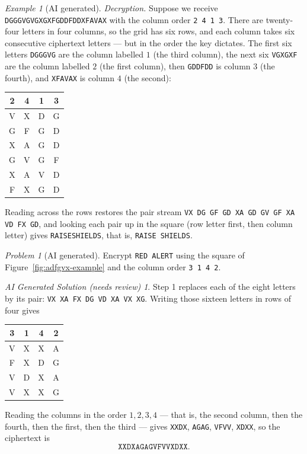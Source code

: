 \documentclass{article}
\theoremstyle{plain}
\theoremstyle{definition}
\theoremstyle{remark}
\newtheorem{example}[theorem]{Example}
\newtheorem{problem}[theorem]{Problem}
\newtheorem*{aisolution}{AI Generated Solution (needs review)}
\numberwithin{theorem}{section}
\begin{document}
\begin{example}[AI generated]
\emph{Decryption.}  Suppose we receive \texttt{DGGGVGVGXGXFGDDFDDXFAVAX} with the column order \texttt{2 4 1 3}.  There are twenty-four letters in four columns, so the grid has six rows, and each column takes six consecutive ciphertext letters --- but in the order the key dictates.  The first six letters \texttt{DGGGVG} are the column labelled $1$ (the third column), the next six \texttt{VGXGXF} are the column labelled $2$ (the first column), then \texttt{GDDFDD} is column $3$ (the fourth), and \texttt{XFAVAX} is column $4$ (the second):
\begin{center}
\begin{tabular}{cccc}
  2 & 4 & 1 & 3 \\
  \hline
  V & X & D & G \\
  G & F & G & D \\
  X & A & G & D \\
  G & V & G & F \\
  X & A & V & D \\
  F & X & G & D \\
\end{tabular}
\end{center}
Reading across the rows restores the pair stream \texttt{VX DG GF GD XA GD GV GF XA VD FX GD}, and looking each pair up in the square (row letter first, then column letter) gives \texttt{RAISESHIELDS}, that is, \texttt{RAISE SHIELDS}.
\end{example}

\begin{problem}[AI generated]
Encrypt \texttt{RED ALERT} using the square of Figure~\ref{fig:adfgvx-example} and the column order \texttt{3 1 4 2}.
\end{problem}
\begin{aisolution}
Step 1 replaces each of the eight letters by its pair:  \texttt{VX XA FX DG VD XA VX XG}.  Writing those sixteen letters in rows of four gives
\begin{center}
\begin{tabular}{cccc}
  3 & 1 & 4 & 2 \\
  \hline
  V & X & X & A \\
  F & X & D & G \\
  V & D & X & A \\
  V & X & X & G \\
\end{tabular}
\end{center}
Reading the columns in the order $1, 2, 3, 4$ --- that is, the second column, then the fourth, then the first, then the third --- gives \texttt{XXDX}, \texttt{AGAG}, \texttt{VFVV}, \texttt{XDXX}, so the ciphertext is
\[
	\texttt{XXDXAGAGVFVVXDXX}.
\]
\end{aisolution}
\end{document}
